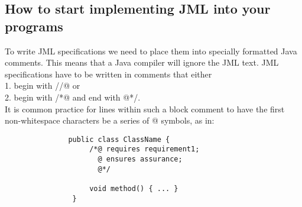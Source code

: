 \documentclass{article}
\begin{document}
\subsection{How to start implementing JML into your programs}
To write JML specifications we need to place them into specially formatted Java comments. This means that a Java compiler will ignore the JML text.
JML specifications have to be written in comments that either\\
1. begin with //@ or\\
2. begin with /*@ and end with @*/.\\
It is common practice for lines within such a block comment to have the first non-whitespace characters be a series of @ symbols, as in:\\

\begin{lstlisting}
               public class ClassName {
                    /*@ requires requirement1;
                      @ ensures assurance;
                      @*/
                      
                    void method() { ... }
                }
\end{lstlisting}
\end{document}
